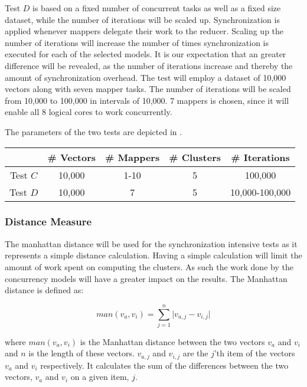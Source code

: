 Test $D$ is based on a fixed number of concurrent tasks as well as a fixed size dataset, while the number of iterations will be scaled up. Synchronization is applied whenever mappers delegate their work to the reducer. Scaling up the number of iterations will increase the number of times synchronization is executed for each of the selected models. It is our expectation that an greater difference will be revealed, as the number of iterations increase and thereby the amount of synchronization overhead. The test will employ a dataset of 10,000 vectors along with seven mapper tasks. The number of iterations will be scaled from 10,000 to 100,000 in intervals of 10,000. 7 mappers is chosen, since it will enable all 8 logical cores to work concurrently.

The parameters of the two tests are depicted in .

\begin{center}
\begin{table}[h]
\centering
\begin{tabular}{c|cccc}
       & \# Vectors        & \# Mappers			 	& \# Clusters & \# Iterations \\ \hline
Test $C$ & 10,000            & 1-10        			& 5           & 100,000      \\
Test $D$ & 10,000			 & 7          			& 5           & 10,000-100,000
\end{tabular}
\end{table}
 \label{tab:test_description} 
\end{center}

\subsubsection{Distance Measure}
The manhattan distance will be used for the synchronization intensive tests as it represents a simple distance calculation. Having a simple calculation will limit the amount of work spent on computing the clusters. As such the work done by the concurrency models will have a greater impact on the results. The Manhattan distance is defined as\cite[p. 41]{amatriain2011data}:
 
\begin{equation}\label{eq:mandistance}
man(v_a,v_i)=\sum_{j=1}^{n}\lvert v_{a,j}-v_{i,j}\rvert
\end{equation}

where $man(v_a,v_i)$ is the Manhattan distance between the two vectors $v_a$ and $v_i$ and $n$ is the length of these vectors. $v_{a,j}$ and $v_{i,j}$ are the $j$'th item of the vectors $v_a$ and $v_i$ respectively. It calculates the sum of the differences between the two vectors, $v_{a}$ and $v_{i}$ on a given item, $j$.


